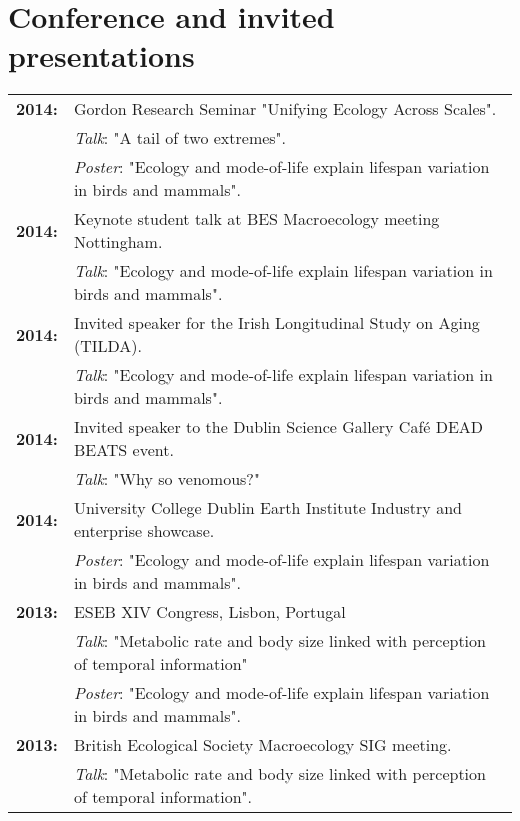 \documentclass[10pt,a4paper]{article}
\begin{document}


\section{Conference and invited presentations}

\raggedright
\begin{tabular}{ll}
\textbf{2014:} & Gordon Research Seminar "Unifying Ecology Across Scales".\\ 
& \textsl{Talk}: "A tail of two extremes".\\
&\textsl{Poster}: "Ecology and mode-of-life explain lifespan variation in birds and mammals".\\
\textbf{2014:} & Keynote student talk at BES Macroecology meeting Nottingham.\\ 
& \textsl{Talk}: "Ecology and mode-of-life explain lifespan variation in birds and mammals".\\
\textbf{2014:} & Invited speaker for the Irish Longitudinal Study on Aging (TILDA).\\ 
& \textsl{Talk}: "Ecology and mode-of-life explain lifespan variation in birds and mammals".\\
\textbf{2014:} & Invited speaker to the Dublin Science Gallery Café DEAD BEATS event.\\ 
& \textsl{Talk}: "Why so venomous?"\\
\textbf{2014:} & University College Dublin Earth Institute Industry and enterprise showcase.\\
&\textsl{Poster}: "Ecology and mode-of-life explain lifespan variation in birds and mammals".\\
\textbf{2013:} & ESEB XIV Congress, Lisbon, Portugal\\
&\textsl{Talk}: "Metabolic rate and body size linked with perception of temporal information"\\
& \textsl{Poster}: "Ecology and mode-of-life explain lifespan variation in birds and mammals".\\
\textbf{2013:} & British Ecological Society Macroecology SIG meeting.\\
&\textsl{Talk}: "Metabolic rate and body size linked with perception of temporal information".\\

\end{tabular}
\end{document}
